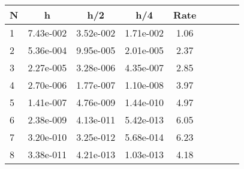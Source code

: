 \begin{tabular}{lcccccccc}
N & h & h/2 & h/4 & Rate\\
\hline
1& 7.43e-002& 3.52e-002& 1.71e-002& 1.06\\
2& 5.36e-004& 9.95e-005& 2.01e-005& 2.37\\
3& 2.27e-005& 3.28e-006& 4.35e-007& 2.85\\
4& 2.70e-006& 1.77e-007& 1.10e-008& 3.97\\
5& 1.41e-007& 4.76e-009& 1.44e-010& 4.97\\
6& 2.38e-009& 4.13e-011& 5.42e-013& 6.05\\
7& 3.20e-010& 3.25e-012& 5.68e-014& 6.23\\
8& 3.38e-011& 4.21e-013& 1.03e-013& 4.18\\
\hline
\end{tabular}
